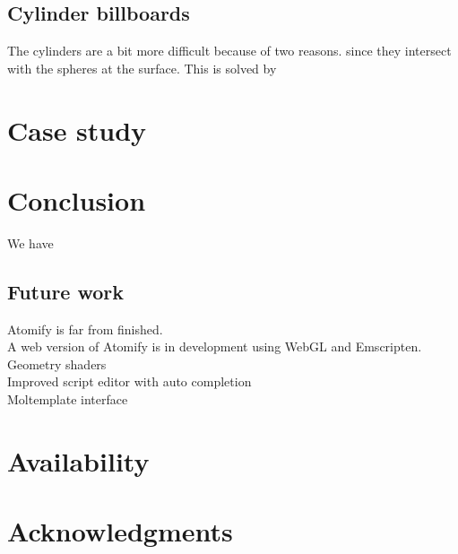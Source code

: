 \documentclass[aps,pre,twocolumn,letterpaper,floatfix]{revtex4}
\begin{document}
\subsection{Cylinder billboards}
The cylinders are a bit more difficult because of two reasons. 
since they intersect with the spheres at the surface. This is solved by 

\section{Case study}

\section{Conclusion}
We have

\subsection{Future work}
Atomify is far from finished.\\
A web version of Atomify is in development using WebGL and Emscripten. \\
Geometry shaders \\
Improved script editor with auto completion \\
Moltemplate interface \\

\section{Availability}

\section{Acknowledgments}



\end{document}
